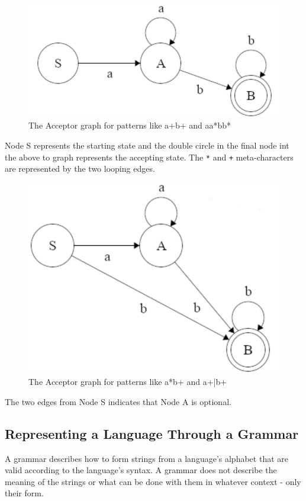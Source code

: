 \documentclass[
]{book}
\begin{document}
\begin{figure}
\includegraphics[width=0.6\linewidth,height=0.6\textheight]{img/09-image01} \caption{The Acceptor graph for patterns like a+b+ and aa*bb*}\label{fig:acceptor1}
\end{figure}

Node S represents the starting state and the double circle in the final node int the above to graph represents the accepting state. The \texttt{*} and \texttt{+} meta-characters are represented by the two looping edges.

\begin{figure}
\includegraphics[width=0.6\linewidth,height=0.6\textheight]{img/09-image02} \caption{The Acceptor graph for patterns like a*b+ and a+|b+}\label{fig:acceptor2}
\end{figure}

The two edges from Node S indicates that Node A is optional.

\hypertarget{representing-a-language-through-a-grammar}{%
\subsection{Representing a Language Through a Grammar}\label{representing-a-language-through-a-grammar}}

A grammar describes how to form strings from a language's alphabet that are valid according to the language's syntax. A grammar does not describe the meaning of the strings or what can be done with them in whatever context - only their form.
\end{document}

